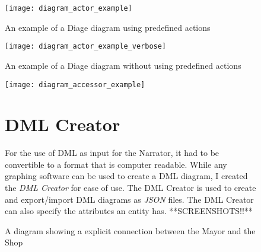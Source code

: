 \begin{figure}[ht]
	\texttt{[image: diagram\_actor\_example]}
	\caption{An example of a Diage diagram using predefined actions}\label{fig:examplediagram}
\end{figure}
\begin{figure}
	\texttt{[image: diagram\_actor\_example\_verbose]}
	\caption{An example of a Diage diagram without using predefined actions}\label{fig:examplediagramverbose}
\end{figure}
\begin{figure}
	\texttt{[image: diagram\_accessor\_example]}
	\caption{A \diage diagram showing a explicit connection between the Mayor and the Shop}
	\label{fig:example:accessors}
\section{DML Creator}	
For the use of DML as input for the Narrator, it had to be convertible to a format that is computer readable. While any graphing software can be used to create a DML diagram, I created the \textit{DML Creator} for ease of use. The DML Creator is used to create and export/import DML diagrams as \textit{JSON} files. The DML Creator can also specify the attributes an entity has. **SCREENSHOTS!!**
	
\end{figure}